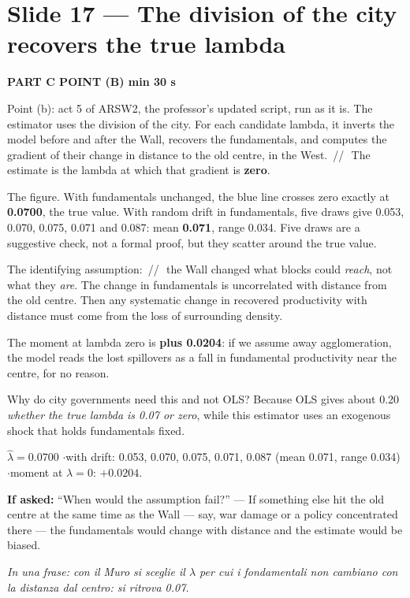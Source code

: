 \documentclass[11pt,a4paper]{article}
\newcommand{\slide}[3]{\Needspace{14\baselineskip}\section{#1}\textcolor{unicared}{\small\bfseries\MakeUppercase{#3}\quad\textperiodcentered\quad #2}\par}
\newcommand{\idea}[1]{\par{\small\itshape\color{unicablue}In una frase: #1}\par}
\newcommand{\pause}{\textcolor{unicared}{\,/\!/\,}}
\begin{document}
\slide{Slide 17 --- The division of the city recovers the true lambda}{1 min 30 s}{Part C \textperiodcentered{} point (b)}

\begin{say}
Point (b): act 5 of ARSW2, the professor's updated script, run as it is. The estimator uses the division of the city. For each candidate lambda, it inverts the model before and after the Wall, recovers the fundamentals, and computes the gradient of their change in distance to the old centre, in the West. \pause\ The estimate is the lambda at which that gradient is \textbf{zero}.

The figure. With fundamentals unchanged, the blue line crosses zero exactly at \textbf{0.0700}, the true value. With random drift in fundamentals, five draws give 0.053, 0.070, 0.075, 0.071 and 0.087: mean \textbf{0.071}, range 0.034. Five draws are a suggestive check, not a formal proof, but they scatter around the true value.

The identifying assumption: \pause\ the Wall changed what blocks could \emph{reach}, not what they \emph{are}. The change in fundamentals is uncorrelated with distance from the old centre. Then any systematic change in recovered productivity with distance must come from the loss of surrounding density.

The moment at lambda zero is \textbf{plus 0.0204}: if we assume away agglomeration, the model reads the lost spillovers as a fall in fundamental productivity near the centre, for no reason.

Why do city governments need this and not OLS? Because OLS gives about 0.20 \emph{whether the true lambda is 0.07 or zero}, while this estimator uses an exogenous shock that holds fundamentals fixed.
\end{say}

\begin{nums}
$\hat\lambda = 0.0700$ \quad$\cdot$\quad with drift: 0.053, 0.070, 0.075, 0.071, 0.087 (mean 0.071, range 0.034) \quad$\cdot$\quad moment at $\lambda=0$: $+0.0204$.
\end{nums}
\begin{ask}
\textbf{If asked:} ``When would the assumption fail?'' --- If something else hit the old centre at the same time as the Wall --- say, war damage or a policy concentrated there --- the fundamentals would change with distance and the estimate would be biased.
\end{ask}
\idea{con il Muro si sceglie il $\lambda$ per cui i fondamentali non cambiano con la distanza dal centro: si ritrova 0.07.}
\end{document}
